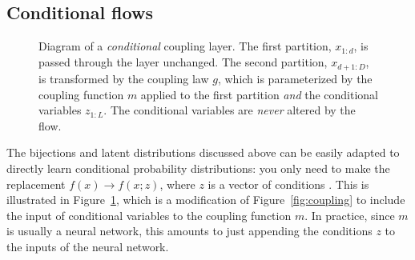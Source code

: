 \documentclass[twocolumn,twocolappendix]{aastex631}
\begin{document}
\subsection{Conditional flows}
\label{sec:conditional}

\begin{figure}
    \centering
    \caption{
        Diagram of a \emph{conditional} coupling layer.
        The first partition, $x^{}_{1:d}$, is passed through the layer unchanged.
        The second partition, $x^{}_{d+1:D}$, is transformed by the coupling law $g$, which is parameterized by the coupling function $m$ applied to the first partition \emph{and} the conditional variables $z^{}_{1:L}$.
        The conditional variables are \emph{never} altered by the flow.
    }
    \label{fig:conditional-coupling}
\end{figure}

The bijections and latent distributions discussed above can be easily adapted to directly learn conditional probability distributions:
you only need to make the replacement $f(x) \to f(x;z)$, where $z$ is a vector of conditions \citep{winkler2019}.
This is illustrated in Figure~\ref{fig:conditional-coupling}, which is a modification of Figure~\ref{fig:coupling} to include the input of conditional variables to the coupling function $m$.
In practice, since $m$ is usually a neural network, this amounts to just appending the conditions $z$ to the inputs of the neural network.
\end{document}
